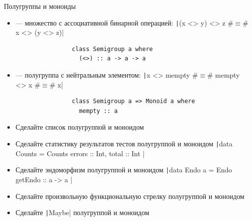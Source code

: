     \begin{frame}[fragile]{Полугруппы и моноиды}
        \begin{itemize}
            \item[\defi]  --- множество с ассоциативной бинарной операцией: \texttt|(x <> y) <> z #$\equiv$# x <> (y <> z)|
            \begin{verbatim}
                class Semigroup a where
                  (<>) :: a -> a -> a
            \end{verbatim}
            \item[\defi]  --- полугруппа с нейтральным элементом: \texttt|x <> mempty #$\equiv$# mempty <> x #$\equiv$# x|
            \begin{verbatim}
                class Semigroup a => Monoid a where
                  mempty :: a
            \end{verbatim}
            \item[\todo] Сделайте список полугруппой и моноидом
            \item[\todo] Сделайте статистику результатов тестов полугруппой и моноидом
            \texttt|data Counts = Counts { errors :: Int, total :: Int }|
            \item[\todo] Сделайте эндоморфизм полугруппой и моноидом
            \texttt|data Endo a = Endo { getEndo :: a -> a }|
            \item[\todo] Сделайте произвольную функциональную стрелку полугруппой и моноидом
            \item[\todo] Сделайте \texttt|Maybe| полугруппой и моноидом
        \end{itemize}
    \end{frame}


